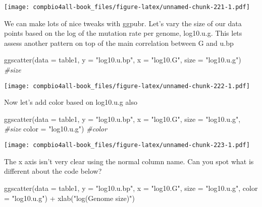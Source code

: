 \documentclass[
]{book}
\newenvironment{Shaded}{\begin{snugshade}}{\end{snugshade}}
\newcommand{\AttributeTok}[1]{\textcolor[rgb]{0.77,0.63,0.00}{#1}}
\newcommand{\CommentTok}[1]{\textcolor[rgb]{0.56,0.35,0.01}{\textit{#1}}}
\newcommand{\FunctionTok}[1]{\textcolor[rgb]{0.00,0.00,0.00}{#1}}
\newcommand{\NormalTok}[1]{#1}
\newcommand{\SpecialCharTok}[1]{\textcolor[rgb]{0.00,0.00,0.00}{#1}}
\newcommand{\StringTok}[1]{\textcolor[rgb]{0.31,0.60,0.02}{#1}}
\begin{document}
\texttt{[image: compbio4all-book\_files/figure-latex/unnamed-chunk-221-1.pdf]}

We can make lots of nice tweaks with ggpubr. Let's vary the size of our data points based on the log of the mutation rate per genome, log10.u.g. This lets assess another pattern on top of the main correlation between G and u.bp

\begin{Shaded}
\begin{Highlighting}[]
\FunctionTok{ggscatter}\NormalTok{(}\AttributeTok{data =}\NormalTok{ table1,}
          \AttributeTok{y =} \StringTok{"log10.u.bp"}\NormalTok{,}
          \AttributeTok{x =} \StringTok{"log10.G"}\NormalTok{,}
          \AttributeTok{size =} \StringTok{"log10.u.g"}\NormalTok{) }\CommentTok{\#size}
\end{Highlighting}
\end{Shaded}

\texttt{[image: compbio4all-book\_files/figure-latex/unnamed-chunk-222-1.pdf]}

Now let's add color based on log10.u.g also

\begin{Shaded}
\begin{Highlighting}[]
\FunctionTok{ggscatter}\NormalTok{(}\AttributeTok{data =}\NormalTok{ table1,}
          \AttributeTok{y =} \StringTok{"log10.u.bp"}\NormalTok{,}
          \AttributeTok{x =} \StringTok{"log10.G"}\NormalTok{,}
          \AttributeTok{size =} \StringTok{"log10.u.g"}\NormalTok{,   }\CommentTok{\#size}
          \AttributeTok{color =} \StringTok{"log10.u.g"}\NormalTok{)  }\CommentTok{\#color}
\end{Highlighting}
\end{Shaded}

\texttt{[image: compbio4all-book\_files/figure-latex/unnamed-chunk-223-1.pdf]}

The x axis isn't very clear using the normal column name. Can you spot what is different about the code below?

\begin{Shaded}
\begin{Highlighting}[]
\FunctionTok{ggscatter}\NormalTok{(}\AttributeTok{data =}\NormalTok{ table1,}
          \AttributeTok{y =} \StringTok{"log10.u.bp"}\NormalTok{,}
          \AttributeTok{x =} \StringTok{"log10.G"}\NormalTok{,}
          \AttributeTok{size =} \StringTok{"log10.u.g"}\NormalTok{,   }
          \AttributeTok{color =} \StringTok{"log10.u.g"}\NormalTok{) }\SpecialCharTok{+}
  \FunctionTok{xlab}\NormalTok{(}\StringTok{"log(Genome size)"}\NormalTok{)}
\end{Highlighting}
\end{Shaded}
\end{document}
